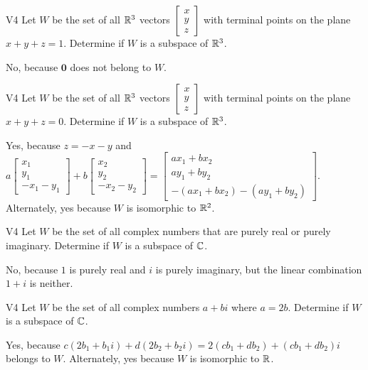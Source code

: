 \begin{problem}{V4} Let \(W\) be the set of all \(\mathbb{R}^3\) vectors
\(\begin{bmatrix} x \\ y \\ z \end{bmatrix}\) with terminal points
on the plane \(x+y+z=1\).
Determine if \(W\) is a subspace of \(\mathbb{R}^3\).
\end{problem}
\begin{solution}
No, because \(\mathbf{0}\) does not belong to \(W\).
\end{solution}


\begin{problem}{V4} Let \(W\) be the set of all \(\mathbb{R}^3\) vectors
\(\begin{bmatrix} x \\ y \\ z \end{bmatrix}\) with terminal points
on the plane \(x+y+z=0\).
Determine if \(W\) is a subspace of \(\mathbb{R}^3\).
\end{problem}
\begin{solution}
Yes, because \(z=-x-y\) and
\(
  a\begin{bmatrix} x_1 \\ y_1 \\ -x_1-y_1 \end{bmatrix}+
  b\begin{bmatrix} x_2 \\ y_2 \\ -x_2-y_2 \end{bmatrix}=
  \begin{bmatrix}
    ax_1+bx_2 \\
    ay_1+by_2 \\
    -(ax_1+bx_2)-(ay_1+by_2)
  \end{bmatrix}
\).
Alternately, yes because \(W\) is isomorphic to \(\mathbb{R}^2\).
\end{solution}


\begin{problem}{V4} Let \(W\) be the set of all complex numbers
that are purely real or purely imaginary.
Determine if \(W\) is a subspace of \(\mathbb{C}\).
\end{problem}
\begin{solution}
No, because \(1\) is purely real and \(i\) is purely imaginary, but
the linear combination \(1+i\) is neither.
\end{solution}


\begin{problem}{V4} Let \(W\) be the set of all complex numbers \(a+bi\)
where \(a=2b\).
Determine if \(W\) is a subspace of \(\mathbb{C}\).
\end{problem}
\begin{solution}
Yes, because \(c(2b_1+b_1i)+d(2b_2+b_2i)=2(cb_1+db_2)+(cb_1+db_2)i\) belongs to
\(W\). Alternately, yes because \(W\) is isomorphic to \(\mathbb{R}\).
\end{solution}
